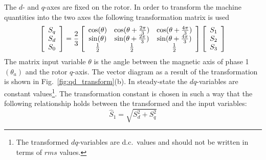 The $d$- and $q$-axes are fixed on the rotor. In order to transform the machine quantities into the two axes the following transformation matrix is used
\begin{equation}
  \left[
  \begin{array}{c}
     S_q\\
     S_d\\
     S_0\\
  \end{array} \right]=\frac{2}{3}\left[
  \begin{array}{c c c}
     \cos(\theta) & \cos(\theta+\frac{2\pi}{3}) & \cos(\theta+\frac{4\pi}{3})\\
     \sin(\theta) & \sin(\theta+\frac{2\pi}{3}) & \sin(\theta+\frac{4\pi}{3})\\
     \frac{1}{2} & \frac{1}{2} & \frac{1}{2}\\
  \end{array} \right]\left[
  \begin{array}{c}
     S_1\\
     S_2\\
     S_3\\
  \end{array} \right]
\end{equation}
The matrix input variable $\theta$ is the angle between the magnetic axis of phase 1 $(\theta_a)$ and the rotor $q$-axis. The vector diagram as a result of the transformation is shown in Fig.~\ref{fig:qd_transform}(b). In steady-state the $dq$-variables are constant values\footnote{The transformed $dq$-variables are d.c.~values and should not be written in terms of $rms$ values.}. The transformation constant is chosen in such a way that the following relationship holds between the transformed and the input variables: 
\begin{equation}
  \hat{S}_1 = \sqrt{S_{d}^{2}+S_{q}^{2}}
\end{equation}

